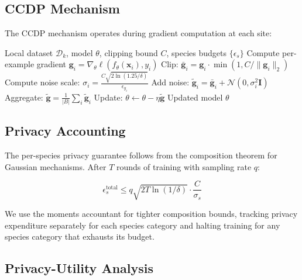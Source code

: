 \subsection{CCDP Mechanism}

The CCDP mechanism operates during gradient computation at each site:

\begin{algorithm}[H]
\caption{Conservation-Calibrated DP-SGD (per-site, per-round)}
\label{alg:ccdp}
\begin{algorithmic}[1]
\REQUIRE Local dataset $\mathcal{D}_k$, model $\theta$, clipping bound $C$, species budgets $\{\epsilon_s\}$
        \STATE Compute per-example gradient $\mathbf{g}_i = \nabla_\theta \ell(f_\theta(\mathbf{x}_i), y_i)$
        \STATE Clip: $\bar{\mathbf{g}}_i = \mathbf{g}_i \cdot \min(1, C / \|\mathbf{g}_i\|_2)$
        \STATE Compute noise scale: $\sigma_i = \frac{C \sqrt{2 \ln(1.25/\delta)}}{\epsilon_{y_i}}$
        \STATE Add noise: $\tilde{\mathbf{g}}_i = \bar{\mathbf{g}}_i + \mathcal{N}(0, \sigma_i^2 \mathbf{I})$
    \ENDFOR
    \STATE Aggregate: $\tilde{\mathbf{g}} = \frac{1}{|B|} \sum_i \tilde{\mathbf{g}}_i$
    \STATE Update: $\theta \leftarrow \theta - \eta \tilde{\mathbf{g}}$
\ENDFOR
\RETURN Updated model $\theta$
\end{algorithmic}
\end{algorithm}

\subsection{Privacy Accounting}

The per-species privacy guarantee follows from the composition theorem for Gaussian mechanisms.
After $T$ rounds of training with sampling rate $q$:

\begin{equation}
    \epsilon_s^{\text{total}} \leq q \sqrt{2T \ln(1/\delta)} \cdot \frac{C}{\sigma_s}
\end{equation}

We use the moments accountant \citep{abadi2016deep} for tighter composition bounds, tracking privacy expenditure separately for each species category and halting training for any species category that exhausts its budget.

\subsection{Privacy-Utility Analysis}

